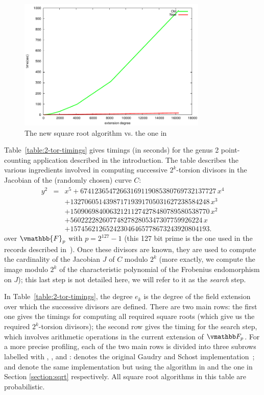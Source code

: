 \begin{figure}[ht]
\begin{center}
\includegraphics[width = 9cm]{sqrtTiming.pdf}
\end{center}
\caption{\small The new square root algorithm vs. the one in \cite{DlsSch2011}}
\label{figure:sqrtTiming}
\end{figure}

Table~\ref{table:2-tor-timings} gives timings (in seconds) for the
genus 2 point-counting application described in the introduction.  The
table describes the various ingredients involved in computing
successive $2^k$-torsion divisors in the Jacobian of the (randomly
chosen) curve $C$:
\[
\begin{array}{rcl}
y^2 &=& 
x^5 + 67412365472663169119085380769732137727\, x^4 \\
&& + 132706051439871719391705031627238584248\, x^3 \\
&& + 150906984006321211274278480789580538770\, x^2 \\
&& + 5602222826077482782805347307759926224\, x \\
&& + 157456212652423046465778673243920804193.
\end{array}
\]
over $\vmathbb{F}_p$ with $p = 2^{127} - 1$ (this 127 bit prime is the
one used in the records described in~\cite{GaSc12}). Once these
divisors are known, they are used to compute the cardinality of the
Jacobian $J$ of $C$ modulo $2^k$ (more exactly, we compute the image
modulo $2^k$ of the characteristic polynomial of the Frobenius
endomorphism on $J$); this last step is not detailed here, we will
refer to it as the {\em search} step.

In Table~\ref{table:2-tor-timings}, the degree $e_k$ is the degree of
the field extension over which the successive divisors are
defined. There are two main rows: the first one gives the timings for
computing all required square roots (which give us the required
$2^k$-torsion divisors); the second row gives the timing for the
search step, which involves arithmetic operations in the current
extension of $\F_p$. For a more precise profiling, each of the two
main rows is divided into three subrows labelled with ,
, and :  denotes the original Gaudry and
Schost implementation~\cite{GaSc12};  and  denote
the same implementation but using the algorithm in \cite{DlsSch2011}
and the one in Section \ref{section:sqrt} respectively. All square root
algorithms in this table are probabilistic.


